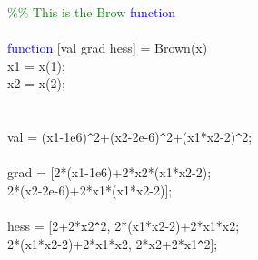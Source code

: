 \hspace{1mm}\textcolor{green}{\%}\textcolor{green}{\% This is the Brow \textcolor{blue}{function} }\\ 
\hspace{1mm} \\ 
\hspace{1mm}\textcolor{blue}{function} [val grad hess] = Brown(x) \\ 
\hspace{1mm}x1 = x(1); \\ 
\hspace{1mm}x2 = x(2); \\ 
\hspace{1mm} \\ 
\hspace{1mm} \\ 
\hspace{1mm}val = (x1-1e6)\texttt{\^}2+(x2-2e-6)\texttt{\^}2+(x1*x2-2)\texttt{\^}2; \\ 
\hspace{1mm} \\ 
\hspace{1mm}grad = [2*(x1-1e6)+2*x2*(x1*x2-2); \\ 
\hspace{1mm}2*(x2-2e-6)+2*x1*(x1*x2-2)]; \\ 
\hspace{1mm} \\ 
\hspace{1mm}hess = [2+2*x2\texttt{\^}2, 2*(x1*x2-2)+2*x1*x2; \\ 
\hspace{1mm}2*(x1*x2-2)+2*x1*x2, 2*x2+2*x1\texttt{\^}2]; \\ 
